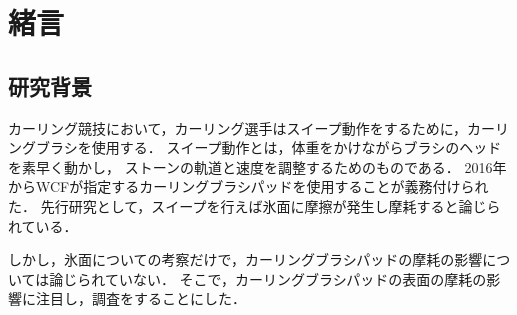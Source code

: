 \documentclass[main]{subfiles}
\begin{document}
\chapter{緒言}
\section{研究背景}
カーリング競技において，カーリング選手はスイープ動作をするために，カーリングブラシを使用する．
スイープ動作とは，体重をかけながらブラシのヘッドを素早く動かし，
ストーンの軌道と速度を調整するためのものである．
2016年からWCFが指定するカーリングブラシパッドを使用することが義務付けられた．
先行研究として，スイープを行えば氷面に摩擦が発生し摩耗すると論じられている\cite{ref:maeno2016}．

しかし，氷面についての考察だけで，カーリングブラシパッドの摩耗の影響については論じられていない．
そこで，カーリングブラシパッドの表面の摩耗の影響に注目し，調査をすることにした．
\end{document}
